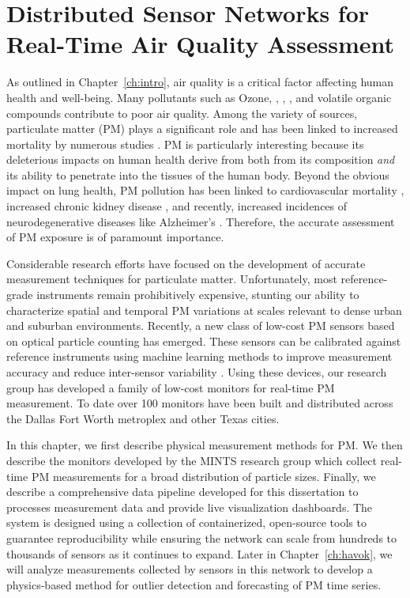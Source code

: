 \chapter{Distributed Sensor Networks for Real-Time Air Quality Assessment}\label{ch:air-network}

As outlined in Chapter~\ref{ch:intro}, air quality is a critical factor
affecting human health and well-being. Many pollutants such as Ozone, ,
, , and volatile organic compounds contribute to poor air
quality. Among the variety of sources, particulate matter (PM) plays a
significant role and has
been linked to increased mortality by numerous studies
\cite{pm-mortality-six-cities, pm-mortality-2}. PM is particularly interesting
because its deleterious impacts on human health derive from both from its
composition \textit{and} its ability to penetrate into the tissues of the human
body. Beyond the obvious impact on lung health, PM pollution has been linked to
cardiovascular mortality \cite{pm-cardiovascular}, increased chronic kidney
disease \cite{pm-kidneys}, and recently, increased incidences of
neurodegenerative diseases like Alzheimer's \cite{pm-neurodegenerative,
  pm-neurodegenerative-2}. Therefore, the accurate assessment of PM exposure is
of paramount importance.

Considerable research efforts have focused on the development of accurate
measurement techniques for particulate matter. Unfortunately, most
reference-grade instruments remain prohibitively expensive, stunting our ability
to characterize spatial and temporal PM variations at scales relevant to dense
urban and suburban environments. Recently, a new class of low-cost PM sensors
based on optical particle counting has emerged. These sensors can be calibrated
against reference instruments using machine learning methods to improve
measurement accuracy and reduce inter-sensor variability
\cite{pm-calibration-lakitha}. Using these devices, our research group has
developed a family of low-cost monitors for real-time PM measurement. To date
over 100 monitors have been built and distributed across the Dallas Fort Worth
metroplex and other Texas cities.

In this chapter, we first describe physical measurement methods for PM. We then
describe the monitors developed by the MINTS research group which collect
real-time PM measurements for a broad distribution of particle sizes. Finally,
we describe a comprehensive data pipeline developed for this dissertation to
processes measurement data and provide live visualization dashboards. The
system is designed using a collection of containerized, open-source tools to
guarantee reproducibility while ensuring the network can scale from hundreds to
thousands of sensors as it continues to expand. Later in Chapter~\ref{ch:havok},
we will analyze measurements collected by sensors in this network to develop a
physics-based method for outlier detection and forecasting of PM time series.

